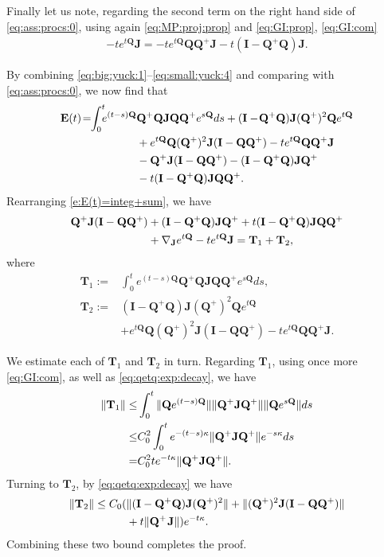 \documentclass[9pt,twocolumn,twoside]{pnas-new}
\newcommand{\?}{\textbf{?}}
\newcommand{\QQ}{\mathbf{Q}}
\newcommand{\JJ}{\mathbf{J}}
\newcommand{\II}{\mathbf{I}}
\newcommand{\Z}{\mathbf{E}}
\newcommand{\TT}{\mathbf{T}}
\begin{document}
Finally let us note, regarding the second term on the right hand side
of \eqref{eq:ass:procs:0}, using again 
\eqref{eq:MP:proj:prop} and \eqref{eq:GI:prop}, \eqref{eq:GI:com}
\begin{align}
  -te^{t\QQ}\JJ 
  =-te^{t\QQ}\QQ \QQ^+ \JJ  - t (\II - \QQ^+\QQ) \JJ.
               \label{eq:small:yuck:4}                          
\end{align}

By combining \eqref{eq:big:yuck:1}--\eqref{eq:small:yuck:4} and
comparing with \eqref{eq:ass:procs:0}, we now find that
\begin{align}\label{e:E(t)=integ+sum}
  \Z(t)\! =\! \! \int_0^t \! \! \! e^{(t-s)\QQ} &\QQ^+ \QQ \JJ \QQ \QQ^{+} e^{s\QQ}ds
           + (\II - \!\QQ^+ \QQ) \JJ (\QQ^{+})^2\QQ e^{t\QQ}
           \notag\\
           &+ e^{t\QQ} \QQ (\QQ^+)^2 \JJ (\II - \QQ \QQ^{+}) -te^{t\QQ}\QQ \QQ^+ \JJ 
           \notag\\
           &-\QQ^+ \JJ (\II - \QQ \QQ^{+})- (\II -\QQ^+ \QQ) \JJ \QQ^{+}
             \notag\\
         &-t(\II -\QQ^+ \QQ) \JJ \QQ \QQ^{+}.
\end{align}
Rearranging \eqref{e:E(t)=integ+sum}, we have 
\begin{align*}
\QQ^+ \JJ (\II - \QQ \QQ^{+}) &+(\II -\QQ^+ \QQ) \JJ \QQ^{+}
   +t(\II -\QQ^+ \QQ) \JJ \QQ \QQ^{+}
                                \notag\\
  &+  \nabla_\JJ e^{t \QQ} - t  e^{t\QQ} \JJ
  = \TT_1 + \TT_2,
\end{align*}
where 
\begin{align*}
 \TT_1 :=&  \int_0^t  \! \! e^{(t-s)\QQ} \QQ^+ \QQ \JJ \QQ \QQ^{+} e^{s\QQ}ds,\\
  \TT_2 :=&  (\II -\QQ^+ \QQ) \JJ (\QQ^{+})^2\QQ e^{t\QQ}\\
         &+ e^{t\QQ} \QQ (\QQ^+)^2 \JJ (\II - \QQ \QQ^{+}) -te^{t\QQ}\QQ \QQ^+ \JJ.
\end{align*}

We estimate each of $\TT_1$ and $\TT_2$ in turn.  Regarding $\TT_1$,
using once more \eqref{eq:GI:com}, as well as \eqref{eq:qetq:exp:decay}, we have
\begin{align*}
  \| \TT_1\| \leq&
    \int_0^t \|\QQ e^{(t-s)\QQ}\| \| \QQ^+  \JJ \QQ^{+} \|\| \QQ e^{s\QQ}\|ds
         \notag\\
   \leq& C_0^2\int_0^t  e^{-(t-s)\kappa} \| \QQ^+  \JJ \QQ^{+} \| e^{-s\kappa } ds
                         \notag\\
   =& C_0^2 t e^{-t\kappa} \| \QQ^+  \JJ  \QQ^{+} \|.
\end{align*}
Turning to $\TT_2$, by \eqref{eq:qetq:exp:decay} we have
\begin{align*}
  \| \TT_2\|
  \leq C_0 (&\| (\II -\QQ^+ \QQ) \JJ (\QQ^{+})^2\|
               + \|(\QQ^+)^2\JJ (\II - \QQ \QQ^{+})\|
               \notag\\
               &+ t\|\QQ^+ \hspace{0.25mm}\JJ\|) e^{- t \kappa }.
\end{align*}
Combining these two bound completes the proof.
\end{document}
